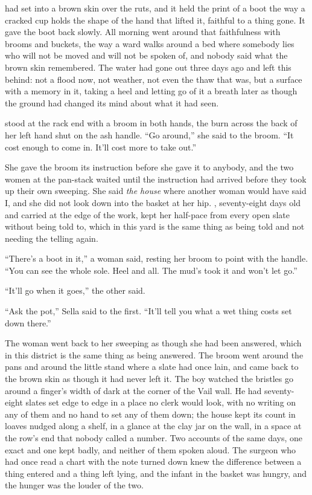 
 had set into a brown skin over the ruts, and it held the print of a boot the way a cracked cup holds the shape of the hand that lifted it, faithful to a thing gone. It gave the boot back slowly. All morning  went around that faithfulness with brooms and buckets, the way a ward walks around a bed where somebody lies who will not be moved and will not be spoken of, and nobody said what the brown skin remembered. The water had gone out three days ago and left this behind: not a flood now, not weather, not even the thaw that was, but a surface with a memory in it, taking a heel and letting go of it a breath later as though the ground had changed its mind about what it had seen.

 stood at the rack end with a broom in both hands, the burn across the back of her left hand shut on the ash handle. “Go around,” she said to the broom. “It cost enough to come in. It’ll cost more to take out.”

She gave the broom its instruction before she gave it to anybody, and the two women at the pan-stack waited until the instruction had arrived before they took up their own sweeping. She said \emph{the house} where another woman would have said I, and she did not look down into the basket at her hip. , seventy-eight days old and carried at the edge of the work, kept her half-pace from every open slate without being told to, which in this yard is the same thing as being told and not needing the telling again.

“There’s a boot in it,” a woman said, resting her broom to point with the handle. “You can see the whole sole. Heel and all. The mud’s took it and won’t let go.”

“It’ll go when it goes,” the other said.

“Ask the pot,” Sella said to the first. “It’ll tell you what a wet thing costs set down there.”

The woman went back to her sweeping as though she had been answered, which in this district is the same thing as being answered. The broom went around the pans and around the little stand where a slate had once lain, and came back to the brown skin as though it had never left it. The boy watched the bristles go around a finger’s width of dark at the corner of the Vail wall. He had seventy-eight slates set edge to edge in a place no clerk would look, with no writing on any of them and no hand to set any of them down; the house kept its count in loaves nudged along a shelf, in a glance at the clay jar on the wall, in a space at the row’s end that nobody called a number. Two accounts of the same days, one exact and one kept badly, and neither of them spoken aloud. The surgeon who had once read a chart with the note turned down knew the difference between a thing entered and a thing left lying, and the infant in the basket was hungry, and the hunger was the louder of the two.

